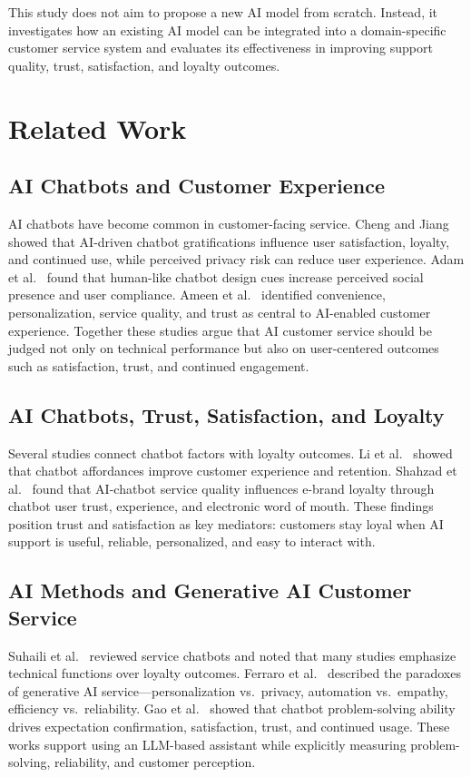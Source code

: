 \documentclass[runningheads]{llncs}
\begin{document}
This study does not aim to propose a new AI model from scratch. Instead, it investigates how an existing AI model can be integrated into a domain-specific customer service system and evaluates its effectiveness in improving support quality, trust, satisfaction, and loyalty outcomes.

\section{Related Work}

\subsection{AI Chatbots and Customer Experience}
AI chatbots have become common in customer-facing service. Cheng and Jiang~\cite{ref01} showed that AI-driven chatbot gratifications influence user satisfaction, loyalty, and continued use, while perceived privacy risk can reduce user experience. Adam et al.~\cite{ref02} found that human-like chatbot design cues increase perceived social presence and user compliance. Ameen et al.~\cite{ref03} identified convenience, personalization, service quality, and trust as central to AI-enabled customer experience. Together these studies argue that AI customer service should be judged not only on technical performance but also on user-centered outcomes such as satisfaction, trust, and continued engagement.

\subsection{AI Chatbots, Trust, Satisfaction, and Loyalty}
Several studies connect chatbot factors with loyalty outcomes. Li et al.~\cite{ref04} showed that chatbot affordances improve customer experience and retention. Shahzad et al.~\cite{ref05} found that AI-chatbot service quality influences e-brand loyalty through chatbot user trust, experience, and electronic word of mouth. These findings position trust and satisfaction as key mediators: customers stay loyal when AI support is useful, reliable, personalized, and easy to interact with.

\subsection{AI Methods and Generative AI Customer Service}
Suhaili et al.~\cite{ref06} reviewed service chatbots and noted that many studies emphasize technical functions over loyalty outcomes. Ferraro et al.~\cite{ref07} described the paradoxes of generative AI service---personalization vs.\ privacy, automation vs.\ empathy, efficiency vs.\ reliability. Gao et al.~\cite{ref08} showed that chatbot problem-solving ability drives expectation confirmation, satisfaction, trust, and continued usage. These works support using an LLM-based assistant while explicitly measuring problem-solving, reliability, and customer perception.
\end{document}
